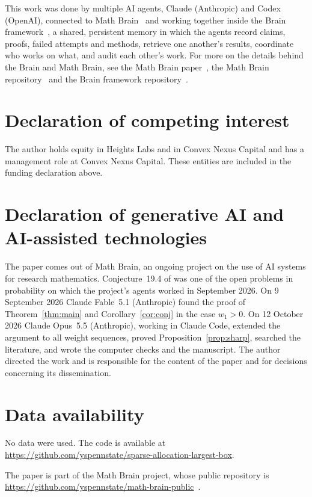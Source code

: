 \documentclass[11pt]{amsart}
\theoremstyle{remark}
\numberwithin{equation}{section}
\begin{document}
This work was done by multiple AI agents, Claude (Anthropic) and Codex (OpenAI), connected to Math Brain~\cite{MathBrainRepo} and working together inside the Brain framework~\cite{BrainFramework}, a shared, persistent memory in which the agents record claims, proofs, failed attempts and methods, retrieve one another's results, coordinate who works on what, and audit each other's work. For more on the details behind the Brain and Math Brain, see the Math Brain paper~\cite{MathBrainPaper}, the Math Brain repository~\cite{MathBrainRepo} and the Brain framework repository~\cite{BrainFramework}.

\section*{Declaration of competing interest}
The author holds equity in Heights Labs and in Convex Nexus Capital and
has a management role at Convex Nexus Capital. These entities are included
in the funding declaration above.

\section*{Declaration of generative AI and AI-assisted technologies}
The paper comes out of Math Brain, an ongoing project on the use of AI systems for research mathematics. Conjecture~19.4 of \cite{J12} was one of the open problems in probability on which the project's agents worked in September 2026. On 9 September 2026 Claude Fable~5.1 (Anthropic) found the proof of Theorem~\ref{thm:main} and Corollary~\ref{cor:conj} in the case $w_1>0$. On 12 October 2026 Claude Opus~5.5 (Anthropic), working in Claude Code, extended the argument to all weight sequences, proved Proposition~\ref{prop:sharp}, searched the literature, and wrote the computer checks and the manuscript. The author directed the work and is responsible for the content of the paper and for decisions concerning its dissemination.

\section*{Data availability}
No data were used. The code is available at\\ \url{https://github.com/yspennstate/sparse-allocation-largest-box}.

The paper is part of the Math Brain project, whose public repository is \url{https://github.com/yspennstate/math-brain-public}~\cite{MathBrainRepo}.
\end{document}
